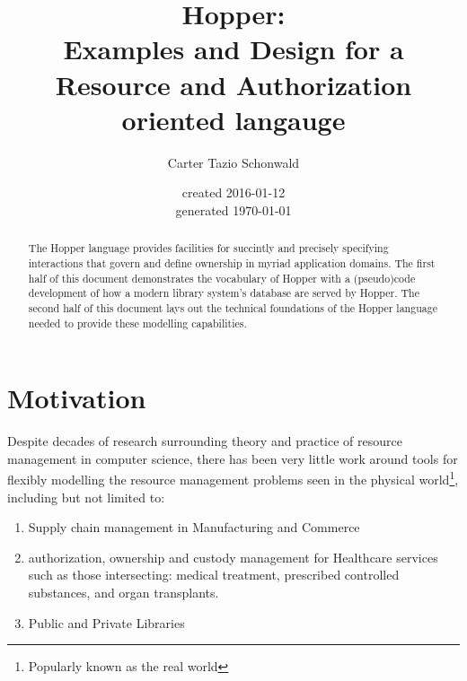 \documentclass[letterpaper,11pt,reqno]{amsart}
\newcommand{\now}{\fullisodate
  \today  \usdate}
\theoremstyle{plain}
\theoremstyle{definition}
\theoremstyle{remark}
\begin{document}
\title{Hopper:\\ Examples and Design for a Resource and Authorization oriented langauge}
\author{Carter Tazio Schonwald}
\date{created 2016-01-12\\generated \now}
\begin{abstract}
The Hopper language provides facilities for succintly and precisely specifying interactions that govern and define ownership in myriad application domains.
The first half of this document demonstrates the vocabulary of Hopper with a (pseudo)code development of how a modern library system's database are served by Hopper.
The second half of this document lays out the technical foundations of the Hopper language
needed to provide these modelling capabilities.

\end{abstract}


\maketitle

\todototoc
\makeatletter
\providecommand\@dotsep{5}
\makeatother
\listoftodos\relax


\section{Motivation} Despite decades of research surrounding theory and practice of resource management in computer science, %
there has been very little work around tools for flexibly modelling the resource management problems
seen in the physical world\footnote{Popularly known as the real world\texttrademark}, including but not limited to:
\begin{enumerate}
  \item Supply chain management in Manufacturing and Commerce
  \item authorization, ownership and custody management for Healthcare services such as those intersecting: medical treatment, prescribed controlled substances, and organ transplants. 
  \item Public and Private Libraries
\end{enumerate}


\end{document}
